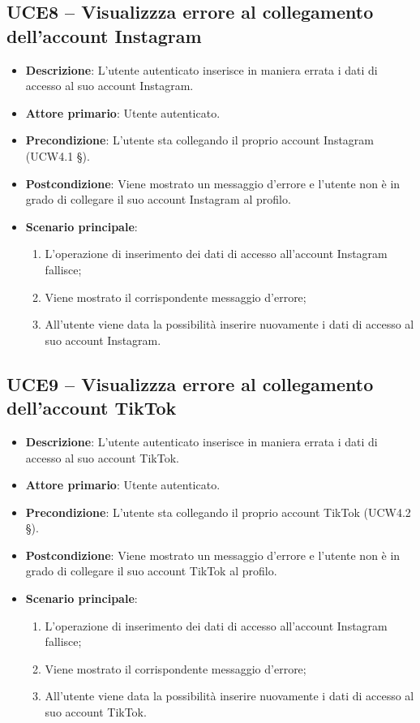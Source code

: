 \subsection{UCE8 – Visualizzza errore al collegamento dell'account Instagram}
\begin{itemize}
\item \textbf{Descrizione}: L'utente autenticato inserisce in maniera errata i dati di accesso al suo account Instagram.
\item \textbf{Attore primario}: Utente autenticato.
\item \textbf{Precondizione}: L'utente sta collegando il proprio account Instagram (UCW4.1 §).
\item \textbf{Postcondizione}: Viene mostrato un messaggio d'errore e l'utente non è in grado di collegare il suo account Instagram al profilo.

\item \textbf{Scenario principale}:
\begin{enumerate}
\item L'operazione di inserimento dei dati di accesso all'account Instagram fallisce;
\item Viene mostrato il corrispondente messaggio d'errore;
\item All'utente viene data la possibilità inserire nuovamente i dati di accesso al suo account Instagram.
\end{enumerate}
\end{itemize}

\subsection{UCE9 – Visualizzza errore al collegamento dell'account TikTok}
\begin{itemize}
\item \textbf{Descrizione}: L'utente autenticato inserisce in maniera errata i dati di accesso al suo account TikTok.
\item \textbf{Attore primario}: Utente autenticato.
\item \textbf{Precondizione}: L'utente sta collegando il proprio account TikTok (UCW4.2 §).
\item \textbf{Postcondizione}: Viene mostrato un messaggio d'errore e l'utente non è in grado di collegare il suo account TikTok al profilo.

\item \textbf{Scenario principale}:
\begin{enumerate}
\item L'operazione di inserimento dei dati di accesso all'account Instagram fallisce;
\item Viene mostrato il corrispondente messaggio d'errore;
\item All'utente viene data la possibilità inserire nuovamente i dati di accesso al suo account TikTok.
\end{enumerate}
\end{itemize}